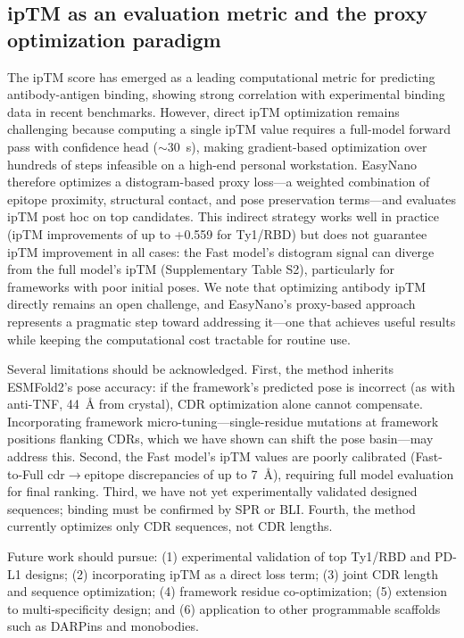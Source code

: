 \documentclass[11pt,a4paper]{article}
\begin{document}
\subsection{ipTM as an evaluation metric and the proxy optimization paradigm}

The ipTM score has emerged as a leading computational metric for predicting antibody-antigen binding, showing strong correlation with experimental binding data in recent benchmarks\cite{lin2023,ruffolo2023}. However, direct ipTM optimization remains challenging because computing a single ipTM value requires a full-model forward pass with confidence head ($\sim$\SI{30}{\second}), making gradient-based optimization over hundreds of steps infeasible on a high-end personal workstation. EasyNano therefore optimizes a distogram-based proxy loss---a weighted combination of epitope proximity, structural contact, and pose preservation terms---and evaluates ipTM post hoc on top candidates. This indirect strategy works well in practice (ipTM improvements of up to +\num{0.559} for Ty1/RBD) but does not guarantee ipTM improvement in all cases: the Fast model's distogram signal can diverge from the full model's ipTM (Supplementary Table S2), particularly for frameworks with poor initial poses. We note that optimizing antibody ipTM directly remains an open challenge, and EasyNano's proxy-based approach represents a pragmatic step toward addressing it---one that achieves useful results while keeping the computational cost tractable for routine use.

Several limitations should be acknowledged. First, the method inherits ESMFold2's pose accuracy: if the framework's predicted pose is incorrect (as with anti-TNF, \SI{44}{\AA} from crystal), CDR optimization alone cannot compensate. Incorporating framework micro-tuning---single-residue mutations at framework positions flanking CDRs, which we have shown can shift the pose basin\cite{hu2026esmfold2}---may address this. Second, the Fast model's ipTM values are poorly calibrated (Fast-to-Full cdr$\to$epitope discrepancies of up to \SI{7}{\AA}), requiring full model evaluation for final ranking. Third, we have not yet experimentally validated designed sequences; binding must be confirmed by SPR or BLI. Fourth, the method currently optimizes only CDR sequences, not CDR lengths.

Future work should pursue: (1) experimental validation of top Ty1/RBD and PD-L1 designs; (2) incorporating ipTM as a direct loss term; (3) joint CDR length and sequence optimization; (4) framework residue co-optimization; (5) extension to multi-specificity design; and (6) application to other programmable scaffolds such as DARPins\cite{pluckthun2015} and monobodies\cite{koide2012}.
\end{document}
